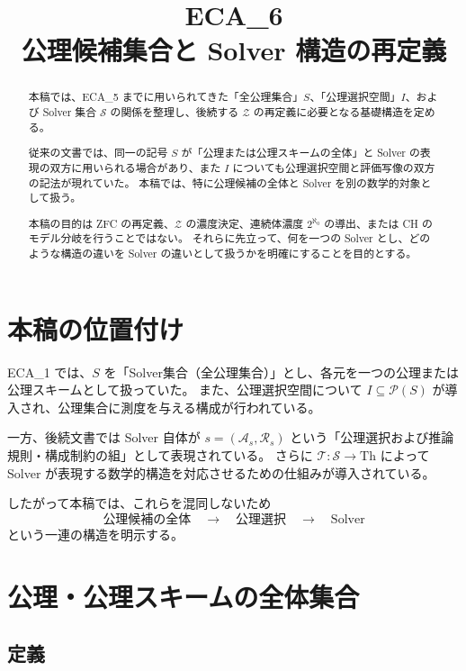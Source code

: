 \documentclass[a4paper,11pt]{jsarticle}
\title{ECA_6\\公理候補集合と Solver 構造の再定義}
\author{}
\date{}
\begin{document}
\maketitle

\begin{abstract}
本稿では、ECA_5 までに用いられてきた「全公理集合」$S$、「公理選択空間」$I$、および Solver 集合 $\mathcal{S}$ の関係を整理し、後続する $\mathcal{Z}$ の再定義に必要となる基礎構造を定める。

従来の文書では、同一の記号 $S$ が「公理または公理スキームの全体」と Solver の表現の双方に用いられる場合があり、また $I$ についても公理選択空間と評価写像の双方の記法が現れていた。
本稿では、特に公理候補の全体と Solver を別の数学的対象として扱う。

本稿の目的は ZFC の再定義、$\mathcal{Z}$ の濃度決定、連続体濃度 $2^{\aleph_0}$ の導出、または CH のモデル分岐を行うことではない。
それらに先立って、何を一つの Solver とし、どのような構造の違いを Solver の違いとして扱うかを明確にすることを目的とする。
\end{abstract}

\section{本稿の位置付け}

ECA_1 では、$S$ を「Solver集合（全公理集合）」とし、各元を一つの公理または公理スキームとして扱っていた。
また、公理選択空間について $I\subseteq\mathcal{P}(S)$ が導入され、公理集合に測度を与える構成が行われている。

一方、後続文書では Solver 自体が $s=(\mathcal{A}_s,\mathcal{R}_s)$ という「公理選択および推論規則・構成制約の組」として表現されている。
さらに $\mathcal{T}:\mathcal{S}\longrightarrow\mathrm{Th}$ によって Solver が表現する数学的構造を対応させるための仕組みが導入されている。

したがって本稿では、これらを混同しないため
\[
\boxed{
\text{公理候補の全体}
\quad\longrightarrow\quad
\text{公理選択}
\quad\longrightarrow\quad
\text{Solver}
}
\]
という一連の構造を明示する。

\section{公理・公理スキームの全体集合}

\subsection{定義}
\end{document}
